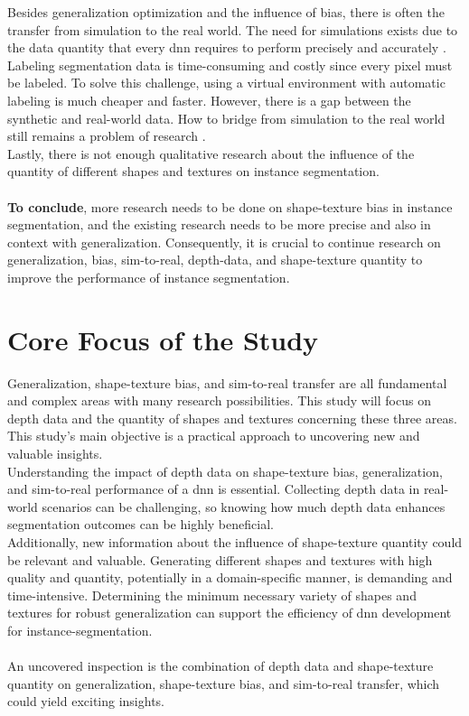 		Besides generalization optimization and the influence of bias, there is often the transfer from simulation to the real world. The need for simulations exists due to the data quantity that every \ac{dnn} requires to perform precisely and accurately \cite {Uchida2016}\cite{Alzubaidi2021}\cite{Csurka2023}. Labeling segmentation data is time-consuming and costly since every pixel must be labeled. To solve this challenge, using a virtual environment with automatic labeling is much cheaper and faster. However, there is a gap between the synthetic and real-world data. How to bridge from simulation to the real world still remains a problem of research \cite{Doersch2019}.\\
		Lastly, there is not enough qualitative research about the influence of the quantity of different shapes and textures on instance segmentation.\\
		\\
		\textbf{To conclude}, more research needs to be done on shape-texture bias in instance segmentation, and the existing research needs to be more precise and also in context with generalization. Consequently, it is crucial to continue research on generalization, bias, sim-to-real, depth-data, and shape-texture quantity to improve the performance of instance segmentation.
		
	
	
	\section{Core Focus of the Study}    %
	\label{sec:core-focus-of-the-study}
		Generalization, shape-texture bias, and sim-to-real transfer are all fundamental and complex areas with many research possibilities. This study will focus on depth data and the quantity of shapes and textures concerning these three areas. This study's main objective is a practical approach to uncovering new and valuable insights.\\
		Understanding the impact of depth data on shape-texture bias, generalization, and sim-to-real performance of a \ac{dnn} is essential. Collecting depth data in real-world scenarios can be challenging, so knowing how much depth data enhances segmentation outcomes can be highly beneficial.\\
		Additionally, new information about the influence of shape-texture quantity could be relevant and valuable. Generating different shapes and textures with high quality and quantity, potentially in a domain-specific manner, is demanding and time-intensive. Determining the minimum necessary variety of shapes and textures for robust generalization can support the efficiency of \ac{dnn} development for instance-segmentation.\\
		\\
		An uncovered inspection is the combination of depth data and shape-texture quantity on generalization, shape-texture bias, and sim-to-real transfer, which could yield exciting insights.
		
